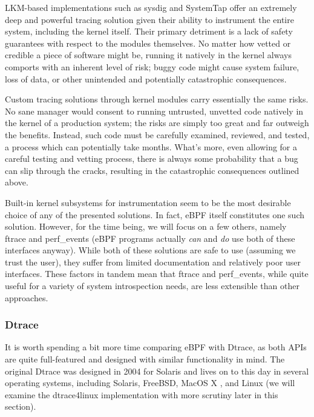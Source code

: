\documentclass[
  12pt]{findlay}
\begin{document}
LKM-based implementations such as sysdig \autocite{sysdig} and SystemTap
\autocite{systemtap} offer an extremely deep and powerful tracing
solution given their ability to instrument the entire system, including
the kernel itself. Their primary detriment is a lack of safety
guarantees with respect to the modules themselves. No matter how vetted
or credible a piece of software might be, running it natively in the
kernel always comports with an inherent level of risk; buggy code might
cause system failure, loss of data, or other unintended and potentially
catastrophic consequences.

Custom tracing solutions through kernel modules carry essentially the
same risks. No sane manager would consent to running untrusted, unvetted
code natively in the kernel of a production system; the risks are simply
too great and far outweigh the benefits. Instead, such code must be
carefully examined, reviewed, and tested, a process which can
potentially take months. What's more, even allowing for a careful
testing and vetting process, there is always some probability that a bug
can slip through the cracks, resulting in the catastrophic consequences
outlined above.

Built-in kernel subsystems for instrumentation seem to be the most
desirable choice of any of the presented solutions. In fact, eBPF
\autocite{starovoitov13} itself constitutes one such solution. However,
for the time being, we will focus on a few others, namely ftrace
\autocite{ftrace} and perf\_events \autocite{manperfeventopen} (eBPF
programs actually \emph{can} and \emph{do} use both of these interfaces
anyway). While both of these solutions are safe to use (assuming we
trust the user), they suffer from limited documentation and relatively
poor user interfaces. These factors in tandem mean that ftrace and
perf\_events, while quite useful for a variety of system introspection
needs, are less extensible than other approaches.

\hypertarget{dtrace}{%
\subsubsection{Dtrace}\label{dtrace}}

It is worth spending a bit more time comparing eBPF with Dtrace, as both
APIs are quite full-featured and designed with similar functionality in
mind. The original Dtrace \autocite{cantrill04} was designed in 2004 for
Solaris and lives on to this day in several operating systems, including
Solaris, FreeBSD, MacOS X \autocite{gregg14}, and Linux
\autocite{dtrace4linux} (we will examine the dtrace4linux implementation
with more scrutiny later in this section).
\end{document}
